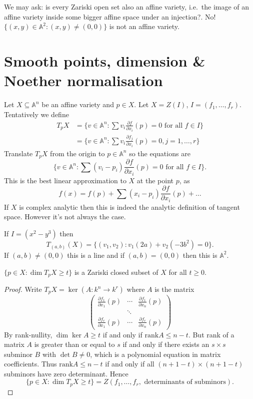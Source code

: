 \documentclass[a4paper]{article}
\renewcommand{\A}{\mathbb{A}}
\begin{document}
We may ask: is every Zariski open set also an affine variety, i.e.\ the image of an affine variety inside some bigger affine space under an injection?. No! \(\{(x, y) \in \A^2: (x, y) \neq (0, 0)\}\) is not an affine variety.

\section{Smooth points, dimension \& Noether normalisation}

Let \(X \subseteq \A^n\) be an affine variety and \(p \in X\). Let \(X = Z(I)\), \(I = (f_1, \dots, f_r)\). Tentatively we define
\begin{align*}
  T_pX
  &= \{v \in \A^n: \sum v_i \frac{\partial f}{\partial x_i}(p) = 0 \text{ for all } f \in I\} \\
  &= \{v \in \A^n: \sum v_i \frac{\partial f_j}{\partial x_i}(p) = 0, j = 1, \dots, r\}
\end{align*}
Translate \(T_pX\) from the origin to \(p \in \A^n\) so the equations are
\[
  \{v \in \A^n: \sum (v_i - p_i) \frac{\partial f}{\partial x_i}(p) = 0 \text{ for all } f \in I\}.
\]
This is the best linear approximation to \(X\) at the point \(p\), as
\[
  f(x) = f(p) + \sum (x_i - p_i) \frac{\partial f}{\partial x_i}(p) + \dots
\]
If \(X\) is complex analytic then this is indeed the analytic definition of tangent space. However it's not always the case.

\begin{eg}
  If \(I = (x^2 - y^3)\) then
  \[
    T_{(a, b)}(X) = \{(v_1, v_2): v_1(2a) + v_2(-3b^2) = 0\}.
  \]
  If \((a, b) \neq (0, 0)\) this is a line and if \((a, b) = (0, 0)\) then this is \(\A^2\).
\end{eg}

\begin{lemma}
  \(\{p \in X: \dim T_pX \geq t\}\) is a Zariski closed subset of \(X\) for all \(t \geq 0\).
\end{lemma}

\begin{proof}
  Write \(T_p X = \ker (A: k^n \to k^r)\) where \(A\) is the matrix
  \[
    \begin{pmatrix}
      \frac{\partial f_1}{\partial x_1}(p) & \cdots & \frac{\partial f_1}{\partial x_n}(p) \\
      & \ddots \\
      \frac{\partial f_r}{\partial x_1}(p) & \cdots & \frac{\partial f_r}{\partial x_n}(p)
    \end{pmatrix}
  \]
  By rank-nullity, \(\dim \ker A \geq t\) if and only if \(\text{rank} A \leq n - t\). But rank of a matrix \(A\) is greater than or equal to \(s\) if and only if there exists an \(s \times s\) subminor \(B\) with \(\det B \neq 0\), which is a polynomial equation in matrix coefficients. Thus \(\text{rank} A \leq n - t\) if and only if all \((n + 1 - t) \times (n + 1 - t)\) subminors have zero determinant. Hence
  \[
    \{p \in X: \dim T_pX \geq t\} = Z(f_1, \dots, f_r, \text{  determinants of subminors}).
  \]
\end{proof}
\end{document}
